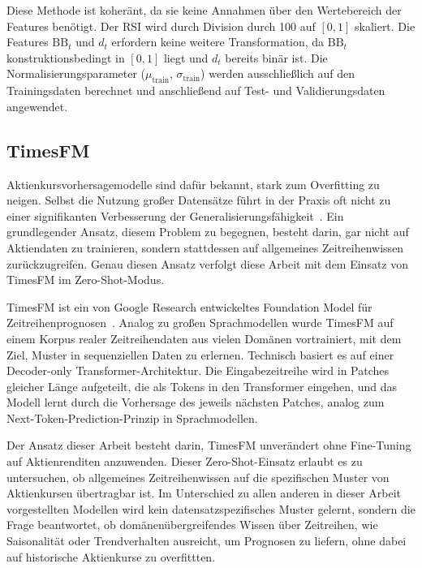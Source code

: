 Diese Methode ist koheränt, da sie keine Annahmen über den Wertebereich der Features benötigt. Der \ac{RSI} wird durch Division durch 100 auf $[0,1]$ skaliert. Die Features $\text{BB}_t$ und $d_t$ erfordern keine weitere Transformation, da $\text{BB}_t$ konstruktionsbedingt in $[0,1]$ liegt und $d_t$ bereits binär ist. Die Normalisierungsparameter ($\mu_{\text{train}}$, $\sigma_{\text{train}}$) werden ausschließlich auf den Trainingsdaten berechnet und anschließend auf Test- und Validierungsdaten angewendet.


\subsection{TimesFM}\label{subsec:timesfm}

Aktienkursvorhersagemodelle sind dafür bekannt, stark zum Overfitting zu neigen. Selbst die Nutzung großer Datensätze führt in der Praxis oft nicht zu einer signifikanten Verbesserung der Generalisierungsfähigkeit~\cite{lopezdeprado2020chaos}. Ein grundlegender Ansatz, diesem Problem zu begegnen, besteht darin, gar nicht auf Aktiendaten zu trainieren, sondern stattdessen auf allgemeines Zeitreihenwissen zurückzugreifen. Genau diesen Ansatz verfolgt diese Arbeit mit dem Einsatz von TimesFM im Zero-Shot-Modus.

TimesFM ist ein von Google Research entwickeltes Foundation Model für Zeitreihenprognosen~\cite{das2024timesfm}. Analog zu großen Sprachmodellen wurde TimesFM auf einem Korpus realer Zeitreihendaten aus vielen Domänen vortrainiert, mit dem Ziel, Muster in sequenziellen Daten zu erlernen. Technisch basiert es auf einer Decoder-only Transformer-Architektur. Die Eingabezeitreihe wird in Patches gleicher Länge aufgeteilt, die als Tokens in den Transformer eingehen, und das Modell lernt durch die Vorhersage des jeweils nächsten Patches, analog zum Next-Token-Prediction-Prinzip in Sprachmodellen.

Der Ansatz dieser Arbeit besteht darin, TimesFM unverändert ohne Fine-Tuning auf Aktienrenditen anzuwenden. Dieser Zero-Shot-Einsatz erlaubt es zu untersuchen, ob allgemeines Zeitreihenwissen auf die spezifischen Muster von Aktienkursen übertragbar ist. Im Unterschied zu allen anderen in dieser Arbeit vorgestellten Modellen wird kein datensatzspezifisches Muster gelernt, sondern die Frage beantwortet, ob domänenübergreifendes Wissen über Zeitreihen, wie Saisonalität oder Trendverhalten ausreicht, um Prognosen zu liefern, ohne dabei auf historische Aktienkurse zu overfittten.

